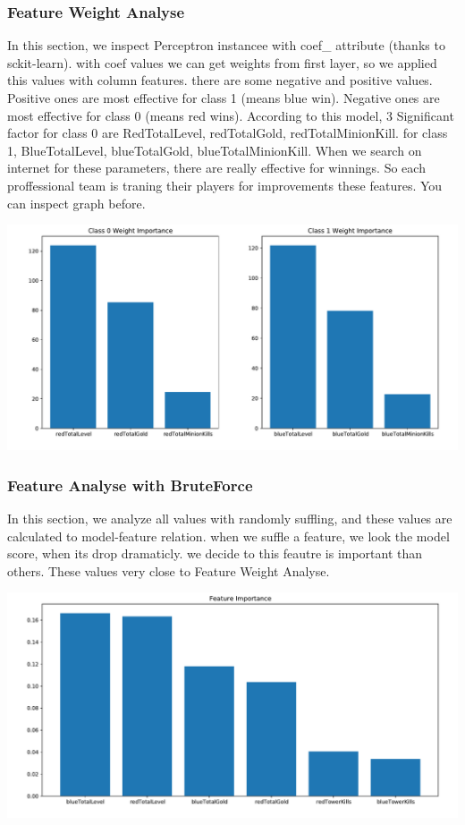 \documentclass[a4paper]{article}
\begin{document}
\subsubsection{Feature Weight Analyse}

In this section, we inspect Perceptron instancee with coef\_ attribute (thanks to sckit-learn). with coef values we can get weights from first layer, so we applied this values with column features. there are some negative and positive values. Positive ones are most effective for class 1 (means blue win). Negative ones are most effective for class 0 (means red wins). According to this model, 3 Significant factor for class 0 are RedTotalLevel, redTotalGold, redTotalMinionKill. for class 1, BlueTotalLevel, blueTotalGold, blueTotalMinionKill. When we search on internet for these parameters, there are really effective for winnings. So each proffessional team is traning their players for improvements these features. You can inspect graph before.

\bigskip


\includegraphics[width=.9\linewidth]{graphs/perceptron_feature_importance_weights.pdf}

\pagebreak

\subsubsection{Feature Analyse with BruteForce}

In this section, we analyze all values with randomly suffling, and these values are calculated to model-feature relation. when we suffle a feature, we look the model score, when its drop dramaticly. we decide to this feautre is important than others. These values very close to Feature Weight Analyse.

\includegraphics[width=.9\linewidth]{graphs/perceptron_feature_importance.pdf}
\end{document}
